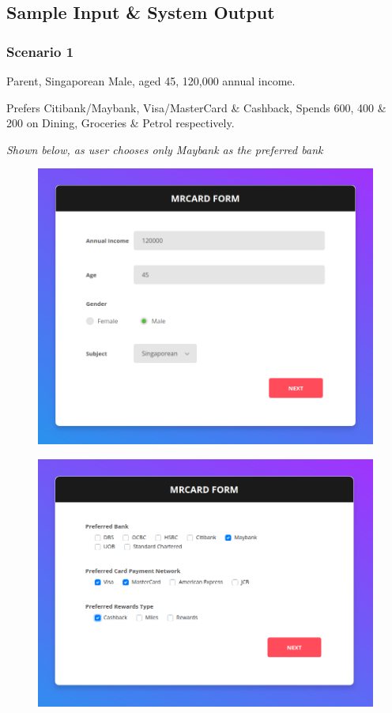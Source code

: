 \subsection{Sample Input \& System Output} %
\label{sub:appendix_a}

	\subsubsection{Scenario 1} %
	\label{ssub:scenario_1}
		Parent, Singaporean Male, aged 45, 120,000 annual income.

		Prefers Citibank/Maybank, Visa/MasterCard \& Cashback, Spends 600, 400 \& 200 on Dining, Groceries \& Petrol respectively.

		\textit{Shown below, as user chooses only Maybank as the preferred bank}

		\begin{figure}[H]
			\centering
			\includegraphics[width=\linewidth]{img/scenario1_eligibility.png}
		\end{figure}

		\begin{figure}[H]
			\centering
			\includegraphics[width=\linewidth]{img/scenario1_preferences_v2.png}
		\end{figure}

